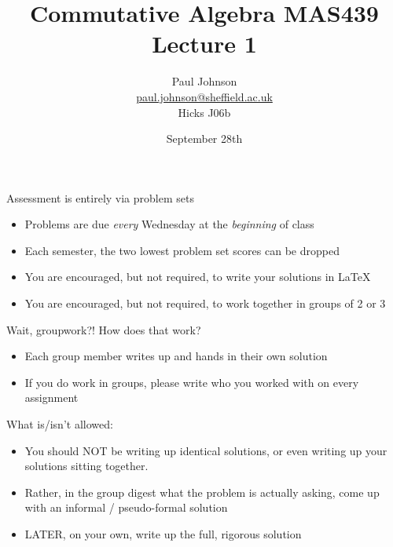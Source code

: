 \documentclass{beamer}
\title{Commutative Algebra MAS439 \\ Lecture 1}
\author{Paul Johnson \\ \href{mailto:paul.johnson@sheffield.ac.uk}{paul.johnson@sheffield.ac.uk} \\ Hicks J06b}
\date{September 28th}
\begin{document}
\begin{frame}
\titlepage
\end{frame}


\begin{frame}{Assessment is entirely via problem sets}

\begin{itemize}
\item Problems are due \emph{every} Wednesday at the \emph{beginning} of class
\item Each semester, the two lowest problem set scores can be dropped
\item You are encouraged, but not required, to write your solutions in \LaTeX
\item You are encouraged, but not required, to work together in groups of 2 or 3
\end{itemize}
\end{frame}


\begin{frame}{Wait, groupwork?! How does that work?}

\begin{itemize}
\item Each group member writes up and hands in their own solution
\item If you do work in groups, please write who you worked with on every assignment
\end{itemize}

\begin{block}{What is/isn't allowed:}
\begin{itemize}
\item You should \alert{NOT} be writing up identical solutions, or even writing up your solutions sitting together.  
\item Rather, in the group digest what the problem is actually asking, come up with an informal / pseudo-formal solution
\item \alert{LATER}, on your own, write up the full, rigorous solution
\end{itemize}
\end{block}

\end{frame}
\end{document}

